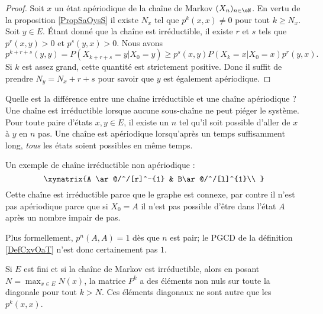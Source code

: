 \begin{proof}
    Soit \( x\) un état apériodique de la chaîne de Markov \( (X_n)_{n\in \eN}\). En vertu de la proposition \ref{PropSaOysS} il existe \( N_x\) tel que \( p^k(x,x)\neq 0\) pour tout \( k\geq N_x\). Soit \( y\in E\). Étant donné que la chaîne est irréductible, il existe \( r\) et \( s\) tels que\( p^r(x,y)>0\) et \( p^s(y,x)>0\). Nous avons
    \begin{equation}
        p^{k+r+s}(y,y)=P(X_{k+r+s}=y|X_0=y)\geq p^s(x,y)P(X_k=x|X_0=x)p^r(y,x).
    \end{equation}
    Si \( k\) est assez grand, cette quantité est strictement positive. Donc il suffit de prendre \( N_y=N_x+r+s\) pour savoir que \( y\) est également apériodique.
\end{proof}

\begin{example}
Quelle est la différence entre une chaîne irréductible et une chaîne apériodique ? Une chaîne est irréductible lorsque aucune sous-chaîne ne peut piéger le système. Pour toute paire d'états \( x,y\in E\), il existe un \( n\) tel qu'il soit possible d'aller de \( x\) à \( y\) en \( n\) pas. Une chaîne est apériodique lorsqu'après un temps suffisamment long, \emph{tous} les états soient possibles en même temps.

Un exemple de chaîne irréductible non apériodique :
\begin{equation}
\xymatrix{%
    A \ar@/^/[r]^-{1}    &   B\ar@/^/[l]^{1}\\
   }
\end{equation}
Cette chaîne est irréductible parce que le graphe est connexe, par contre il n'est pas apériodique parce que si \( X_0=A\) il n'est pas possible d'être dans l'état \( A\) après un nombre impair de pas.

Plus formellement, \( p^n(A,A)=1\) dès que \( n\) est pair; le PGCD de la définition \ref{DefCxvOaT} n'est donc certainement pas \( 1\).
\end{example}

Si \( E\) est fini et si la chaîne de Markov est irréductible, alors en posant \( N=\max_{x\in E}N(x)\), la matrice \( P^k\) a des éléments non nuls sur toute la diagonale pour tout \( k>N\). Ces éléments diagonaux ne sont autre que les \( p^k(x,x)\).

